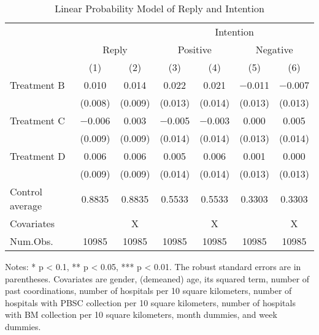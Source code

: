 \documentclass[
  11pt,
  a4paper
]{article}
\begin{document}
\begin{table}

\caption{\label{tab:reg-stock}Linear Probability Model of Reply and Intention}
\centering
\fontsize{9}{11}\selectfont
\begin{threeparttable}
\begin{tabular}[t]{lcccccc}
\toprule
\multicolumn{3}{c}{ } & \multicolumn{4}{c}{Intention} \\
\cmidrule(l{3pt}r{3pt}){4-7}
\multicolumn{1}{c}{ } & \multicolumn{2}{c}{Reply} & \multicolumn{2}{c}{Positive} & \multicolumn{2}{c}{Negative} \\
\cmidrule(l{3pt}r{3pt}){2-3} \cmidrule(l{3pt}r{3pt}){4-5} \cmidrule(l{3pt}r{3pt}){6-7}
  & (1) & (2) & (3) & (4) & (5) & (6)\\
\midrule
Treatment B & \num{0.010} & \num{0.014} & \num{0.022} & \num{0.021} & \num{-0.011} & \num{-0.007}\\
 & (\num{0.008}) & (\num{0.009}) & (\num{0.013}) & (\num{0.014}) & (\num{0.013}) & (\num{0.013})\\
Treatment C & \num{-0.006} & \num{0.003} & \num{-0.005} & \num{-0.003} & \num{0.000} & \num{0.005}\\
 & (\num{0.009}) & (\num{0.009}) & (\num{0.014}) & (\num{0.014}) & (\num{0.013}) & (\num{0.014})\\
Treatment D & \num{0.006} & \num{0.006} & \num{0.005} & \num{0.006} & \num{0.001} & \num{0.000}\\
 & (\num{0.009}) & (\num{0.009}) & (\num{0.014}) & (\num{0.014}) & (\num{0.013}) & (\num{0.013})\\
\midrule
Control average & 0.8835 & 0.8835 & 0.5533 & 0.5533 & 0.3303 & 0.3303\\
Covariates &  & X &  & X &  & X\\
Num.Obs. & \num{10985} & \num{10985} & \num{10985} & \num{10985} & \num{10985} & \num{10985}\\
\bottomrule
\end{tabular}
\begin{tablenotes}
\item Notes: * p < 0.1, ** p < 0.05, *** p < 0.01. The robust standard errors are in parentheses. Covariates are gender, (demeaned) age, its squared term, number of past coordinations, number of hospitals per 10 square kilometers, number of hospitals with PBSC collection per 10 square kilometers, number of hospitals with BM collection per 10 square kilometers, month dummies, and week dummies.
\end{tablenotes}
\end{threeparttable}
\end{table}
\end{document}
